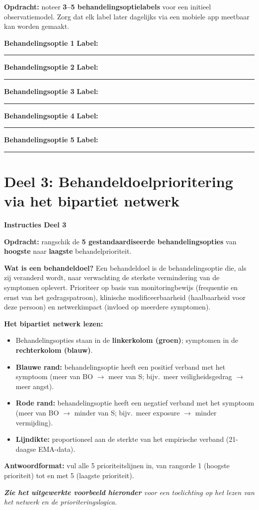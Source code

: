 \documentclass[11pt,a4paper]{article}
\newcommand{\behandelingsoptieslot}[1]{%
\vspace{0.25em}\noindent
\begin{tcolorbox}[colback=SoftBG,colframe=BorderGrey,boxrule=0.4pt,arc=1.5mm,left=8pt,right=8pt,top=5pt,bottom=5pt]%
\small\textbf{\color{SlateMid}Behandelingsoptie #1}\hspace{1em}%
\textbf{Label:}\hspace{0.5em}\rule{0.56\linewidth}{0.25pt}%
\end{tcolorbox}%
}
\begin{document}
\begin{responsebox}
\small\textbf{Opdracht:} noteer \textbf{3--5 behandelingsoptielabels} voor een initieel observatiemodel.
Zorg dat elk label later dagelijks via een mobiele app meetbaar kan worden gemaakt.

\behandelingsoptieslot{1}
\behandelingsoptieslot{2}
\behandelingsoptieslot{3}
\behandelingsoptieslot{4}
\behandelingsoptieslot{5}
\end{responsebox}

\vspace{0.6em}
\newpage


\section{Deel 3: Behandeldoelprioritering via het bipartiet netwerk}

\begin{tcolorbox}[colback=yellow!5,colframe=GoldAmber,arc=2.5mm,boxrule=0.9pt,
  left=10pt,right=10pt,top=9pt,bottom=9pt]
\textbf{\color{GoldAmber}Instructies Deel 3}

\smallskip\small
\textbf{Opdracht:} rangschik de \textbf{5 gestandaardiseerde behandelingsopties} van
\textbf{hoogste} naar \textbf{laagste} behandelprioriteit.

\textbf{Wat is een behandeldoel?}
Een behandeldoel is de behandelingsoptie die, als zij veranderd wordt, naar verwachting de
sterkste vermindering van de symptomen oplevert. Prioriteer op basis van monitoringbewijs
(frequentie en ernst van het gedragspatroon), klinische modificeerbaarheid
(haalbaarheid voor deze persoon) en netwerkimpact (invloed op meerdere symptomen).

\textbf{Het bipartiet netwerk lezen:}
\begin{itemize}[topsep=2pt,itemsep=1pt]
\item Behandelingsopties staan in de \textbf{linkerkolom (groen)}; symptomen in de \textbf{rechterkolom (blauw)}.
\item \textbf{Blauwe rand:} behandelingsoptie heeft een positief verband met het symptoom
(meer van BO $\rightarrow$ meer van S; bijv.\ meer veiligheidsgedrag $\rightarrow$ meer angst).
\item \textbf{Rode rand:} behandelingsoptie heeft een negatief verband met het symptoom
(meer van BO $\rightarrow$ minder van S; bijv.\ meer exposure $\rightarrow$ minder vermijding).
\item \textbf{Lijndikte:} proportioneel aan de sterkte van het empirische verband
(21-daagse EMA-data).
\end{itemize}

\textbf{Antwoordformat:} vul alle 5 prioriteitslijnen in, van rangorde 1 (hoogste prioriteit)
tot en met 5 (laagste prioriteit).

\medskip
\textit{\textbf{Zie het uitgewerkte voorbeeld hieronder} voor een toelichting op het lezen van het netwerk en de prioriteringslogica.}
\end{tcolorbox}
\end{document}
